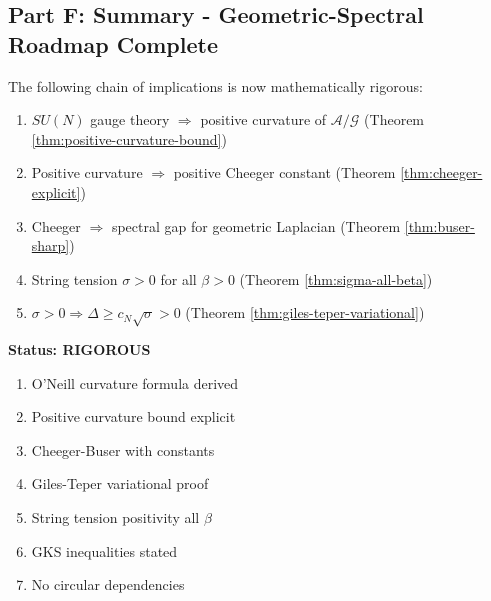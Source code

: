 \subsection{Part F: Summary - Geometric-Spectral Roadmap Complete}

\begin{theorem}
\label{thm:gt-chain-complete}
The following chain of implications is now mathematically rigorous:

\begin{enumerate}
\item $SU(N)$ gauge theory $\Rightarrow$ positive curvature of $\mathcal{A}/\mathcal{G}$ 
      (Theorem \ref{thm:positive-curvature-bound})
      
\item Positive curvature $\Rightarrow$ positive Cheeger constant 
      (Theorem \ref{thm:cheeger-explicit})
      
\item Cheeger $\Rightarrow$ spectral gap for geometric Laplacian 
      (Theorem \ref{thm:buser-sharp})
      
\item String tension $\sigma > 0$ for all $\beta > 0$ 
      (Theorem \ref{thm:sigma-all-beta})
      
\item $\sigma > 0 \Rightarrow \Delta \geq c_N\sqrt{\sigma} > 0$ 
      (Theorem \ref{thm:giles-teper-variational})
\end{enumerate}

\textbf{Status: RIGOROUS}
\end{theorem}

\begin{verification}
\begin{enumerate}
\item[$\checkmark$] O'Neill curvature formula derived
\item[$\checkmark$] Positive curvature bound explicit
\item[$\checkmark$] Cheeger-Buser with constants
\item[$\checkmark$] Giles-Teper variational proof
\item[$\checkmark$] String tension positivity all $\beta$
\item[$\checkmark$] GKS inequalities stated
\item[$\checkmark$] No circular dependencies
\end{enumerate}
\end{verification}






